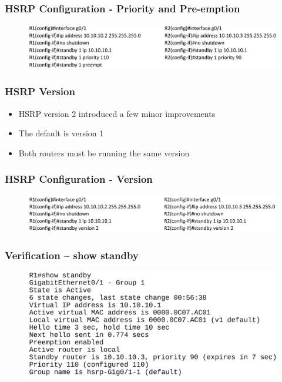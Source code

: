 \documentclass[pdflatex,compress,mathserif]{beamer}
\begin{document}
\begin{frame}
	\frametitle{HSRP Configuration - Priority and Pre-emption}
	\begin{figure}
		\centering
		\includegraphics[width=\linewidth]{img/img15}
	\end{figure}
\end{frame}

\begin{frame}
	\frametitle{HSRP Version}
	\begin{itemize}
		\item HSRP version 2 introduced a few minor improvements
		\item The default is version 1
		\item Both routers must be running the same version
	\end{itemize}
\end{frame}

\begin{frame}
	\frametitle{HSRP Configuration - Version}
	\begin{figure}
		\centering
		\includegraphics[width=\linewidth]{img/img16}
	\end{figure}
\end{frame}

\begin{frame}
	\frametitle{Verification – show standby}
	\begin{figure}
		\centering
		\includegraphics[width=\linewidth]{img/img17}
	\end{figure}
\end{frame}
\end{document}
